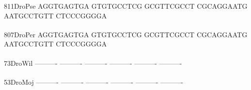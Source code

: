 \documentclass[11pt,twoside,reqno,a4paper]{article}
\begin{document}
{811\hspace*{2\charwidth}DroPse	AGGTGAGTGA	GTGTGCCTCG	GCGTTCGCCT	CGCAGGAATG	AATGCCTGTT	CTCCCGGGGA	\\
\hspace*{5\charwidth}\hspace*{7\charwidth}\hspace*{1\charwidth}\hspace*{1\charwidth}\hspace*{1\charwidth}\hspace*{1\charwidth}\hspace*{1\charwidth}\hspace*{1\charwidth}\\
807\hspace*{2\charwidth}DroPer	AGGTGAGTGA	GTGTGCCTCG	GCGTTCGCCT	CGCAGGAATG	AATGCCTGTT	CTCCCGGGGA	\\
\hspace*{5\charwidth}\hspace*{7\charwidth}\hspace*{1\charwidth}\hspace*{1\charwidth}\hspace*{1\charwidth}\hspace*{1\charwidth}\hspace*{1\charwidth}\hspace*{1\charwidth}\\
73\hspace*{3\charwidth}DroWil	----------	----------	----------	----------	----------	----------	\\
\hspace*{5\charwidth}\hspace*{7\charwidth}\hspace*{1\charwidth}\hspace*{1\charwidth}\hspace*{1\charwidth}\hspace*{1\charwidth}\hspace*{1\charwidth}\hspace*{1\charwidth}\\
53\hspace*{3\charwidth}DroMoj	----------	----------	----------	----------	----------	----------	\\
\hspace*{5\charwidth}\hspace*{7\charwidth}\hspace*{1\charwidth}\hspace*{1\charwidth}\hspace*{1\charwidth}\hspace*{1\charwidth}\hspace*{1\charwidth}\hspace*{1\charwidth}\\
}
\end{document}

